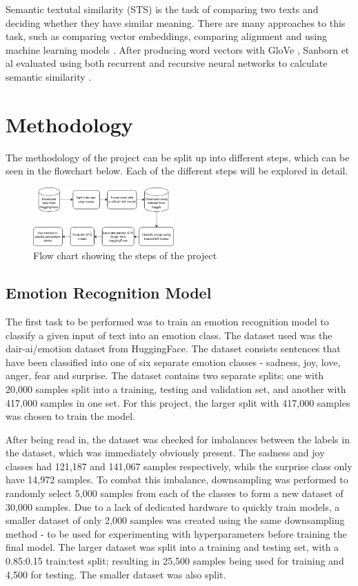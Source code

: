 \documentclass[11pt]{article}
\begin{document}
Semantic textutal similarity (STS) is the task of comparing two texts and deciding whether they have similar meaning. There are many approaches to this task, such as comparing vector embeddings, comparing alignment and using machine learning models \cite{semanticTextSimilarity}. After producing word vectors with GloVe \cite{pennington-etal-2014-glove}, Sanborn et al evaluated using both recurrent and recursive neural networks to calculate semantic similarity \cite{Sanborn2015DeepLF}.

\section{Methodology}
The methodology of the project can be split up into different steps, which can be seen in the flowchart below. Each of the different steps will be explored in detail.

\begin{figure}[H]
    \centering
    \includegraphics[width=0.48\textwidth]{images/codeFlow.png}
    \caption{Flow chart showing the steps of the project}
\end{figure}

\subsection{Emotion Recognition Model}
The first task to be performed was to train an emotion recognition model to classify a given input of text into an emotion class. The dataset used was the dair-ai/emotion dataset \cite{emotiondata} from HuggingFace. The dataset consists sentences that have been classified into one of six separate emotion classes - sadness, joy, love, anger, fear and surprise. The dataset contains two separate splits; one with 20,000 samples split into a training, testing and validation set, and another with 417,000 samples in one set. For this project, the larger split with 417,000 samples was chosen to train the model.

After being read in, the dataset was checked for imbalances between the labels in the dataset, which was immediately obviously present. The sadness and joy classes had 121,187 and 141,067 samples respectively, whils the surprise class only have 14,972 samples. To combat this imbalance, downsampling was performed to randomly select 5,000 samples from each of the classes to form a new dataset of 30,000 samples. Due to a lack of dedicated hardware to quickly train models, a smaller dataset of only 2,000 samples was created using the same downsampling method - to be used for experimenting with hyperparameters before training the final model. The larger dataset was split into a training and testing set, with a 0.85:0.15 train:test split; resulting in 25,500 samples being used for training and 4,500 for testing. The smaller dataset was also split.
\end{document}
